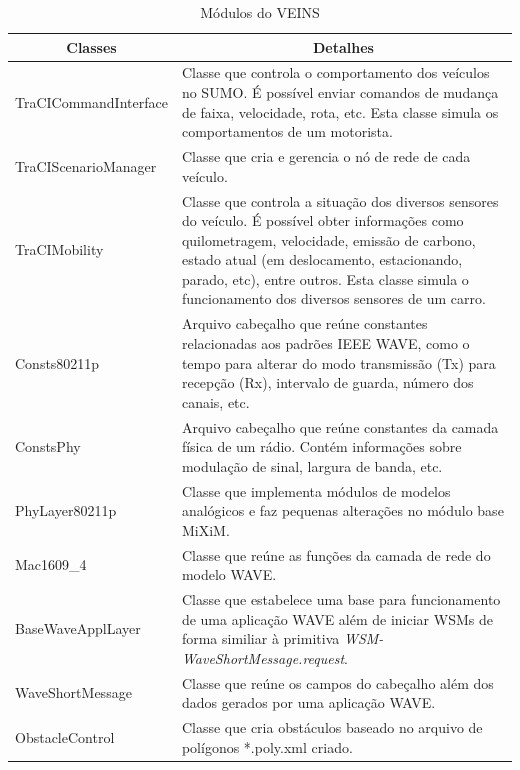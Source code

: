 \documentclass[
12pt,				%
openright,			%
oneside,			%
a4paper,			%
brazil,				%
]{abntex2}
\begin{document}
	\begin{table}[H]
		\renewcommand{\arraystretch}{1.5}
		\centering
		\begin{tabular}{|l|p{10.5cm}|}
			\hline
			\multicolumn{1}{|c|}{\textbf{Classes}} & \multicolumn{1}{c|}{\textbf{Detalhes}} \\ \hline
			TraCICommandInterface & Classe que controla o comportamento dos veículos no SUMO. É possível enviar comandos de mudança de faixa, velocidade, rota, etc. Esta classe simula os comportamentos de um motorista. \\ \hline
			TraCIScenarioManager & Classe que cria e gerencia o nó de rede de cada veículo. \\ \hline
			TraCIMobility & Classe que controla a situação dos diversos sensores do veículo. É possível obter informações como quilometragem, velocidade, emissão de carbono, estado atual (em deslocamento, estacionando, parado, etc), entre outros. Esta classe simula o funcionamento dos diversos sensores de um carro. \\ \hline
			Consts80211p & Arquivo cabeçalho que reúne constantes relacionadas aos padrões IEEE WAVE, como o tempo para alterar do modo transmissão (Tx) para recepção (Rx), intervalo de guarda, número dos canais, etc. \\ \hline
			ConstsPhy & Arquivo cabeçalho que reúne constantes da camada física de um rádio. Contém informações sobre modulação de sinal, largura de banda, etc. \\ \hline
			PhyLayer80211p & Classe que implementa módulos de modelos analógicos e faz  pequenas alterações no módulo base MiXiM. \\ \hline
			Mac1609\_4 & Classe que reúne as funções da camada de rede do modelo WAVE. \\ \hline
			BaseWaveApplLayer & Classe que estabelece uma base para funcionamento de uma aplicação WAVE além de iniciar WSMs de forma similiar à primitiva \textit{WSM-WaveShortMessage.request}. \\ \hline
			WaveShortMessage & Classe que reúne os campos do cabeçalho além dos dados gerados por uma aplicação WAVE. \\ \hline
			ObstacleControl & Classe que cria obstáculos baseado no arquivo de polígonos *.poly.xml criado. \\ 
			\hline
		\end{tabular}
			\caption{Módulos do VEINS}
			\label{tab_7}
	\end{table}
	
\end{document}
